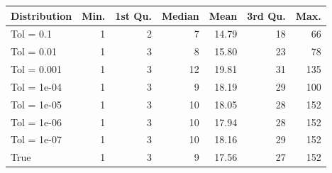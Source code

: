 \begin{figure} 
\begin{tabular}{lrrrrrr}
 Distribution & Min. & 1st Qu. & Median & Mean & 3rd Qu. & Max. \\ 
  \hline
\hline
Tol =  0.1 & 1 & 2 & 7 & 14.79 & 18 & 66 \\ 
  Tol =  0.01 & 1 & 3 & 8 & 15.80 & 23 & 78 \\ 
  Tol =  0.001 & 1 & 3 & 12 & 19.81 & 31 & 135 \\ 
  Tol =  1e-04 & 1 & 3 & 9 & 18.19 & 29 & 100 \\ 
  Tol =  1e-05 & 1 & 3 & 10 & 18.05 & 28 & 152 \\ 
  Tol =  1e-06 & 1 & 3 & 10 & 17.94 & 28 & 152 \\ 
  Tol =  1e-07 & 1 & 3 & 10 & 18.16 & 29 & 152 \\ 
  True & 1 & 3 & 9 & 17.56 & 27 & 152 \\ 
  \end{tabular}
\label{tab:SummaryTable}
\end{figure} 
